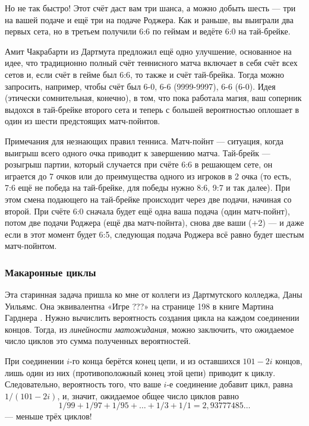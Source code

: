 Но не так быстро!
Этот счёт даст вам три шанса, а можно добыть шесть --- три на вашей подаче и ещё три на подаче Роджера.
Как и раньше, вы выиграли два первых сета, но в третьем получили 6:6 по геймам и ведёте 6:0 на тай-брейке.

Амит Чакрабарти из Дартмута предложил ещё одно улучшение, основанное на идее, что традиционно полный счёт теннисного матча включает в себя счёт всех сетов и, если счёт в гейме был 6:6, то также и счёт тай-брейка.
Тогда можно запросить, например, чтобы счёт был 6-0, 6-6 (9999-9997), 6-6 (6-0).
Идея (этически сомнительная, конечно), в том, что пока работала магия, ваш соперник выдохся в тай-брейке второго сета и теперь с большей вероятностью оплошает в один из шести предстоящих матч-пойнтов.

\begin{addedbytheeditors}
Примечания для незнающих правил тенниса.
Матч-пойнт --- ситуация, когда выигрыш всего одного очка приводит к завершению матча.
Тай-брейк --- розыгрыш партии, который
случается при счёте 6:6 в решающем сете, он играется до 7 очков или до
преимущества
одного из игроков в 2 очка (то есть, 7:6 ещё не победа на тай-брейке, для победы нужно 8:6, 9:7 и так далее).
При этом смена подающего на тай-брейке происходит через две подачи, начиная со второй.
При счёте 6:0 сначала будет ещё одна ваша подача (один матч-пойнт), потом две подачи Роджера (ещё два матч-пойнта), снова две ваши (+2) --- и даже если в этот момент будет 6:5, следующая подача Роджера всё равно будет шестым матч-пойнтом.\pr
\end{addedbytheeditors}

\subsubsection*{Макаронные циклы}

Эта старинная задача пришла ко мне от коллеги из Дартмутского колледжа, Даны Уильямс.
Она эквивалентна «Игре ???» на странице 198 в книге Мартина Гарднера \cite{26}.
Нужно вычислить вероятность создания цикла на каждом соединении концов.
Тогда, из \emph{линейности матожидания}, можно заключить, что ожидаемое число циклов это сумма полученных вероятностей.

При соединении $i$-го конца берётся конец цепи, и из оставшихся $101 - 2i$ концов, лишь один из них (противоположный конец этой цепи) приводит к циклу.
Следовательно, вероятность того, что ваше $i$-е соединение добавит цикл, равна $1/(101 - 2i)$, и, значит, ожидаемое общее число циклов равно 
\[1/99 + 1/97 + 1/95 +\dots + 1/3 + 1/1 = 2{,}93777485\dots\]
--- меньше трёх циклов!

